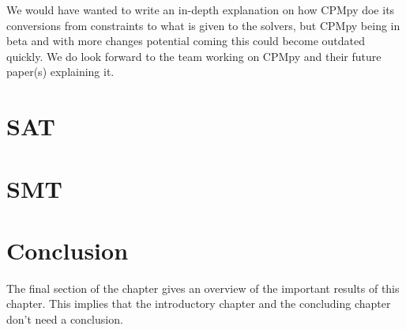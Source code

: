 
We would have wanted to write an in-depth explanation on how CPMpy doe its conversions from constraints to what is given to the solvers, but CPMpy being in beta and with more changes potential coming this could become outdated quickly. We do look forward to the team working on CPMpy and their future paper(s) explaining it.

\section{SAT}
\label{CS:SAT}


\section{SMT}
\label{CS:SMT}


\section{Conclusion}
\label{CS:conclusion}
The final section of the chapter gives an overview of the important results
of this chapter. This implies that the introductory chapter and the
concluding chapter don't need a conclusion.

